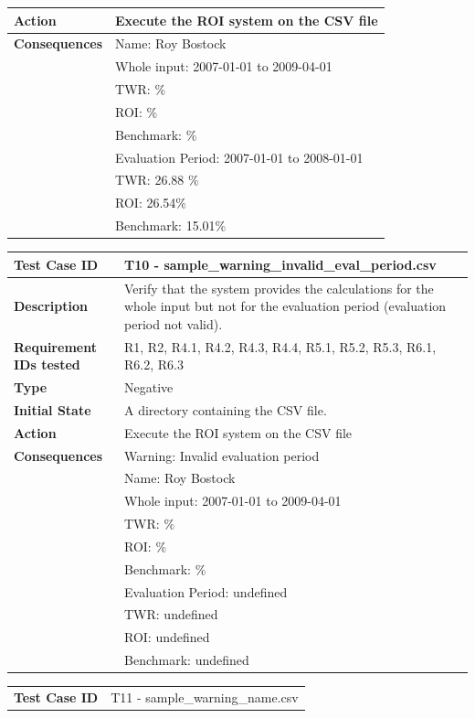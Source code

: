 \documentclass[runningheads,12pt]{article}
\begin{document}
{\begin{tabular}{|p{1.2in}|p{4in}|}
\hline 
\textbf{Action} & Execute the ROI system on the CSV file \\
\hline 
\textbf{Consequences} & Name: Roy Bostock\\
& Whole input: 2007-01-01 to 2009-04-01\\
& TWR:  $\%$\\
& ROI: $\%$\\
& Benchmark: $\%$ \\ 
& Evaluation Period: 2007-01-01 to 2008-01-01\\
& TWR: 26.88 $\%$\\
& ROI: 26.54$\%$\\
& Benchmark: 15.01$\%$ \\ 
\hline
\end{tabular}
\bigskip
\centering
\begin{tabular}{|p{1.2in}|p{4in}|}
\hline
\textbf{Test Case ID} & T10 - sample\_warning\_invalid\_eval\_period.csv \\ 
\hline
\textbf{Description} & Verify that the system provides the calculations for the whole input but not for the evaluation period (evaluation period not valid).\\
\hline
\textbf{Requirement IDs tested} & R1, R2, R4.1, R4.2, R4.3, R4.4, R5.1, R5.2, R5.3, R6.1, R6.2, R6.3 \\ 
\hline
\textbf{Type} & Negative \\ 
\hline
\textbf{Initial State} & A directory containing the CSV file.\\
\hline 
\textbf{Action} & Execute the ROI system on the CSV file \\
\hline 
\textbf{Consequences} & Warning: Invalid evaluation period\\
& Name: Roy Bostock\\
& Whole input: 2007-01-01 to 2009-04-01\\
& TWR:  $\%$\\
& ROI: $\%$\\
& Benchmark: $\%$ \\ 
& Evaluation Period: undefined\\
& TWR: undefined\\
& ROI: undefined\\
& Benchmark: undefined \\ 
\hline
\end{tabular}
\bigskip
\centering
\begin{tabular}{|p{1.2in}|p{4in}|}
\hline
\textbf{Test Case ID} & T11 - sample\_warning\_name.csv \\ 

\end{tabular}}
\end{document}
